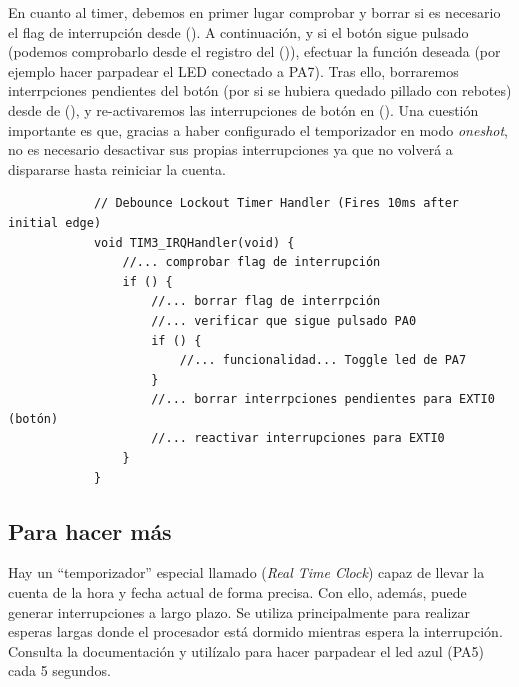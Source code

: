 \documentclass[../main.tex]{subfiles}
\begin{document}
        En cuanto al timer, debemos en primer lugar comprobar y borrar si es necesario el flag de interrupción desde  (\REFMAN[19.4.5]). A continuación, y si el botón sigue pulsado (podemos comprobarlo desde el registro  del  (\REFMAN[6.4.5])), efectuar la función deseada (por ejemplo hacer parpadear el LED conectado a PA7). Tras ello, borraremos interrpciones pendientes del botón (por si se hubiera quedado pillado con rebotes) desde  de  (\REFMAN[10.9.6]), y re-activaremos las interrupciones de botón en  (\REFMAN[10.9.1]). Una cuestión importante es que, gracias a haber configurado el temporizador en modo \emph{oneshot}, no es necesario desactivar sus propias interrupciones ya que no volverá a dispararse hasta reiniciar la cuenta.

        \begin{lstlisting}            
            // Debounce Lockout Timer Handler (Fires 10ms after initial edge)
            void TIM3_IRQHandler(void) {
                //... comprobar flag de interrupción
                if () {
                    //... borrar flag de interrpción
                    //... verificar que sigue pulsado PA0
                    if () {
                        //... funcionalidad... Toggle led de PA7
                    }
                    //... borrar interrpciones pendientes para EXTI0 (botón) 
                    //... reactivar interrupciones para EXTI0
                }
            }
        \end{lstlisting}
    


    
    \subsection{Para hacer más}
        Hay un ``temporizador'' especial llamado  (\emph{Real Time Clock}) capaz de llevar la cuenta de la hora y fecha actual de forma precisa. Con ello, además, puede generar interrupciones a largo plazo. Se utiliza principalmente para realizar esperas largas donde el procesador está dormido mientras espera la interrupción. Consulta la documentación y utilízalo para hacer parpadear el led azul (PA5) cada 5 segundos.
\end{document}
